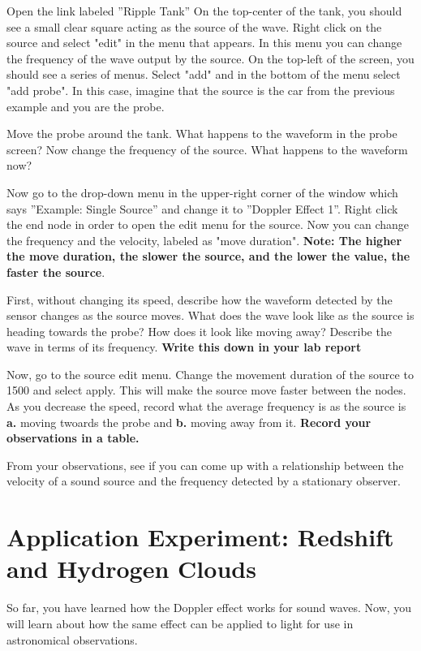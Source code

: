 \begin{steps}
	\item Open the link labeled ''Ripple Tank'' On the top-center of the tank, you should see a small clear square acting as the source of the wave. Right click on the source and select "edit" in the menu that appears. In this menu you can change the frequency of the wave output by the source. On the top-left of the screen, you should see a series of menus. Select "add" and in the bottom of the menu select "add probe". In this case, imagine that the source is the car from the previous example and you are the probe. 
	
	\item Move the probe around the tank. What happens to the waveform in the probe screen? Now change the frequency of the source. What happens to the waveform now? 
	
	\item Now go to the drop-down menu in the upper-right corner of the window which says ''Example: Single Source'' and change it to ''Doppler Effect 1''. Right click the end node in order to open the edit menu for the source. Now you can change the frequency and the velocity, labeled as "move duration". \textbf{Note: The higher the move duration, the slower the source, and the lower the value, the faster the source}. 
	
	\item First, without changing its speed, describe how the waveform detected by the sensor changes as the source moves. What does the wave look like as the source is heading towards the probe? How does it look like moving away? Describe the wave in terms of its frequency. \textbf{Write this down in your lab report}
	
	\item Now, go to the source edit menu. Change the movement duration of the source to 1500 and select apply. This will make the source move faster between the nodes. As you decrease the speed, record what the average frequency is as the source is \textbf{a.} moving twoards the probe and \textbf{b.} moving away from it. \textbf{Record your observations in a table.}
	
	\item From your observations, see if you can come up with a relationship between the velocity of a sound source and the frequency detected by a stationary observer. 

\end{steps}

  
\section{Application Experiment: Redshift and Hydrogen Clouds}
So far, you have learned how the Doppler effect works for sound waves. Now, you will learn about how the same effect can be applied to light for use in astronomical observations.

